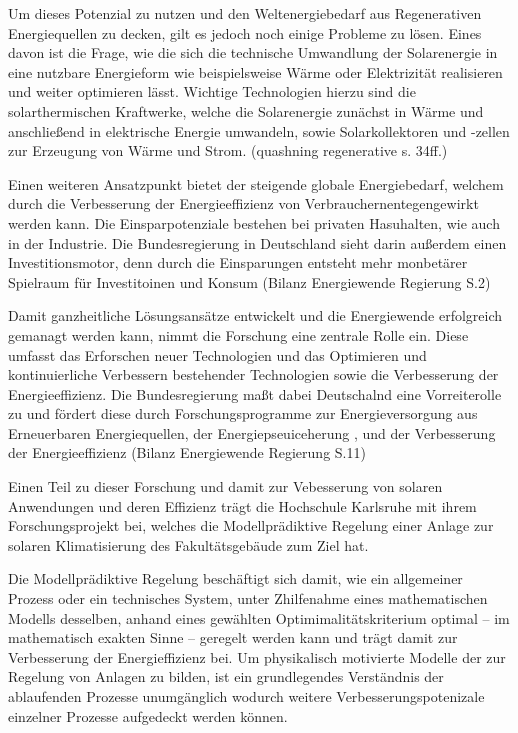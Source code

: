 Um dieses Potenzial zu nutzen und den Weltenergiebedarf aus Regenerativen Energiequellen zu decken, gilt es jedoch noch einige Probleme zu lösen. Eines davon ist die Frage, wie die sich die technische Umwandlung der Solarenergie in eine nutzbare Energieform wie beispielsweise Wärme oder Elektrizität realisieren und weiter optimieren lässt. Wichtige Technologien hierzu sind die solarthermischen Kraftwerke, welche die Solarenergie zunächst in Wärme und anschließend in elektrische Energie umwandeln, sowie Solarkollektoren und -zellen zur Erzeugung von Wärme und Strom. (quashning regenerative s. 34ff.)

Einen weiteren Ansatzpunkt bietet der steigende globale Energiebedarf, welchem durch die Verbesserung der Energieeffizienz von Verbrauchernentegengewirkt werden kann. Die Einsparpotenziale bestehen bei privaten Hasuhalten, wie auch in der Industrie. Die Bundesregierung in Deutschland sieht darin außerdem einen Investitionsmotor, denn durch die Einsparungen entsteht mehr monbetärer Spielraum für Investitoinen und Konsum (Bilanz Energiewende Regierung S.2)

Damit ganzheitliche Lösungsansätze entwickelt und die Energiewende erfolgreich gemanagt werden kann, nimmt die Forschung eine zentrale Rolle ein. Diese umfasst das Erforschen neuer Technologien und das Optimieren und kontinuierliche Verbessern bestehender Technologien sowie die Verbesserung der Energieeffizienz. Die Bundesregierung maßt dabei Deutschalnd eine Vorreiterolle zu und fördert diese durch Forschungsprogramme zur Energieversorgung aus Erneuerbaren Energiequellen, der Energiepseuiceherung , und der Verbesserung der Energieeffizienz (Bilanz Energiewende Regierung S.11)
 
Einen Teil zu dieser Forschung und damit zur Vebesserung von solaren Anwendungen und deren Effizienz trägt die Hochschule Karlsruhe mit ihrem Forschungsprojekt bei, welches die Modellprädiktive Regelung einer Anlage zur solaren Klimatisierung des Fakultätsgebäude zum Ziel hat.

Die Modellprädiktive Regelung beschäftigt sich damit, wie ein allgemeiner Prozess oder ein technisches System, unter Zhilfenahme eines mathematischen Modells desselben, anhand eines gewählten Optimimalitätskriterium optimal -- im mathematisch exakten Sinne -- geregelt werden kann und trägt damit zur Verbesserung der Energieffizienz bei. Um  physikalisch motivierte Modelle der zur Regelung von Anlagen zu bilden, ist ein grundlegendes Verständnis der ablaufenden Prozesse unumgänglich wodurch weitere Verbesserungspotenizale einzelner Prozesse aufgedeckt werden können.

